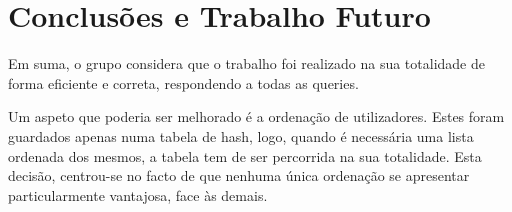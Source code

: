 \documentclass[10pt,a4paper]{report}
\begin{document}
\chapter{Conclusões e Trabalho Futuro}
    Em suma, o grupo considera que o trabalho foi realizado na sua
    totalidade de forma eficiente e correta, respondendo a todas as queries.

    Um aspeto que poderia ser melhorado é a ordenação de utilizadores. Estes
    foram guardados apenas numa tabela de hash, logo, quando é necessária uma
    lista ordenada dos mesmos, a tabela tem de ser percorrida na sua totalidade.
    Esta decisão, centrou-se no facto de que nenhuma única ordenação se
    apresentar particularmente vantajosa, face às demais.
\end{document}
